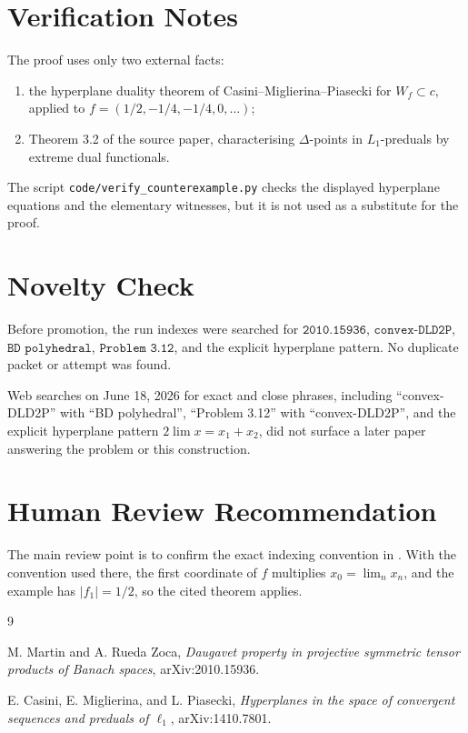 \documentclass[11pt]{article}
\begin{document}
\section*{Verification Notes}

The proof uses only two external facts:
\begin{enumerate}[label=(\arabic*)]
\item the hyperplane duality theorem of Casini--Miglierina--Piasecki for
      \(W_f\subset c\), applied to \(f=(1/2,-1/4,-1/4,0,\ldots)\);
\item Theorem 3.2 of the source paper, characterising \(\Delta\)-points in
      \(L_1\)-preduals by extreme dual functionals.
\end{enumerate}
The script \texttt{code/verify\_counterexample.py} checks the displayed
hyperplane equations and the elementary witnesses, but it is not used as a
substitute for the proof.

\section*{Novelty Check}

Before promotion, the run indexes were searched for
\(\texttt{2010.15936}\), \(\texttt{convex-DLD2P}\),
\(\texttt{BD polyhedral}\), \(\texttt{Problem 3.12}\), and the explicit
hyperplane pattern.  No duplicate packet or attempt was found.

Web searches on June 18, 2026 for exact and close phrases, including
``convex-DLD2P'' with ``BD polyhedral'', ``Problem 3.12'' with
``convex-DLD2P'', and the explicit hyperplane pattern \(2\lim x=x_1+x_2\),
did not surface a later paper answering the problem or this construction.

\section*{Human Review Recommendation}

The main review point is to confirm the exact indexing convention in
\cite[Theorem 4.3]{CMP2014}.  With the convention used there, the first
coordinate of \(f\) multiplies \(x_0=\lim_n x_n\), and the example has
\(|f_1|=1/2\), so the cited theorem applies.

\begin{thebibliography}{9}

M. Martin and A. Rueda Zoca,
\emph{Daugavet property in projective symmetric tensor products of Banach spaces},
arXiv:2010.15936.

E. Casini, E. Miglierina, and L. Piasecki,
\emph{Hyperplanes in the space of convergent sequences and preduals of \(\ell_1\)},
arXiv:1410.7801.

\end{thebibliography}
\end{document}
